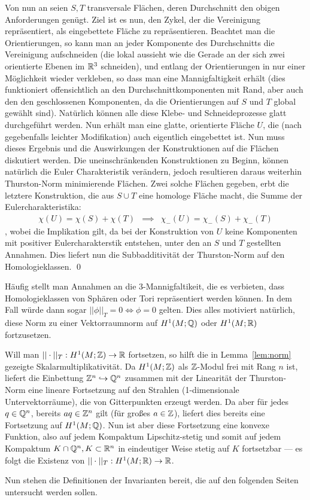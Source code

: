             Von nun an seien $S,T$ transversale Flächen, deren Durchschnitt den obigen Anforderungen genügt. Ziel ist es nun, den Zykel, der die Vereinigung repräsentiert, als eingebettete Fläche zu repräsentieren. Beachtet man die Orientierungen, so kann man an jeder Komponente des Durchschnitts die Vereinigung aufschneiden (die lokal aussieht wie die Gerade an der sich zwei orientierte Ebenen im $\mathbb{R}^3$ schneiden), und entlang der Orientierungen in nur einer Möglichkeit wieder verkleben, so dass man eine Mannigfaltigkeit erhält (dies funktioniert offensichtlich an den Durchschnittkomponenten mit Rand, aber auch den den geschlossenen Komponenten, da die Orientierungen auf $S$ und $T$ global gewählt sind). Natürlich können alle diese Klebe- und Schneideprozesse glatt durchgeführt werden. Nun erhält man eine glatte, orientierte Fläche $U$, die (nach gegebenfalls leichter Modifikation) auch eigentlich eingebettet ist. Nun muss dieses Ergebnis und die Auswirkungen der Konstruktionen auf die Flächen diskutiert werden. Die uneinschränkenden Konstruktionen zu Beginn, können natürlich die Euler Charakteristik verändern, jedoch resultieren daraus weiterhin Thurston-Norm minimierende Flächen. Zwei solche Flächen gegeben, erbt die letztere Konstruktion, die aus $S\cup T$ eine homologe Fläche macht, die Summe der Eulercharakteristika:
            \begin{eqnarray*}
                \chi(U) = \chi(S) + \chi(T) &\implies& \chi_-(U)=\chi_-(S) + \chi_-(T) 
            \end{eqnarray*}
            , wobei die Implikation gilt, da bei der Konstruktion von $U$ keine Komponenten mit positiver Eulercharakterstik entstehen, unter den an $S$ und $T$ gestellten Annahmen. Dies liefert nun die Subbadditivität der Thurston-Norm auf den Homologieklassen.
        \qed

        Häufig stellt man Annahmen an die 3-Mannigfaltikeit, die es verbieten, dass Homologieklassen von Sphären oder Tori repräsentiert werden können. In dem Fall würde dann sogar $||\phi||_T=0 \Leftrightarrow \phi=0$ gelten. Dies alles motiviert natürlich, diese Norm zu einer Vektorraumnorm auf $H^1(M;\mathbb{Q})$ oder $H^1(M;\mathbb{R})$ fortzusetzen. 
        \begin{bem}
        \label{rem:extendingthurston}
            Will man $||\cdot||_T: H^1(M;\mathbb{Z}) \to \mathbb{R}$ fortsetzen, so hilft die in Lemma~\ref{lem:norm} gezeigte Skalarmultiplikativität. Da $H^1(M;\mathbb{Z})$ als $\mathbb{Z}$-Modul frei mit Rang $n$ ist, liefert die Einbettung $\mathbb{Z}^n \hookrightarrow \mathbb{Q}^n$ zusammen mit der Linearität der Thurston-Norm eine lineare Fortsetzung auf den Strahlen (1-dimensionale Untervektorräume), die von Gitterpunkten erzeugt werden. Da aber für jedes $q \in \mathbb{Q}^n$, bereits $aq \in \mathbb{Z}^n$ gilt (für großes $a\in \mathbb{Z}$), liefert dies bereits eine Fortsetzung auf $H^1(M;\mathbb{Q})$. Nun ist aber diese Fortsetzung eine konvexe Funktion, also auf jedem Kompaktum Lipschitz-stetig und somit auf jedem Kompaktum $K\cap \mathbb{Q}^n, K\subset \mathbb{R}^n$ in eindeutiger Weise stetig auf $K$ fortsetzbar --- es folgt die Existenz von $||\cdot||_T:H^1(M;\mathbb{R}) \to \mathbb{R}$.
        \end{bem}
        Nun stehen die Definitionen der Invarianten bereit, die auf den folgenden Seiten untersucht werden sollen.
